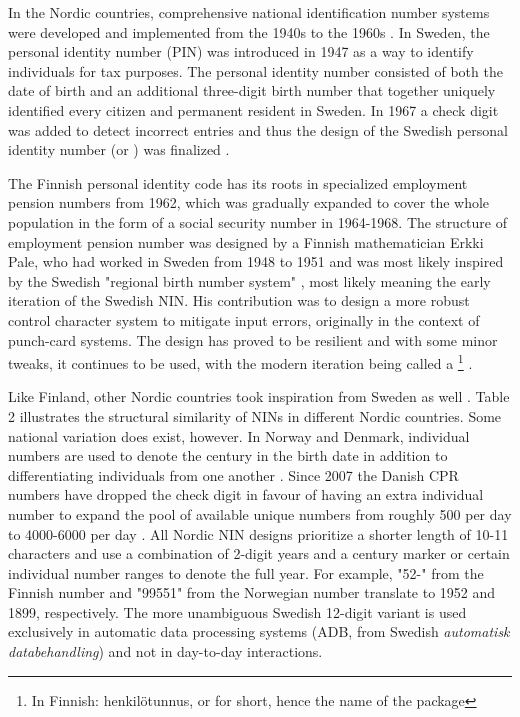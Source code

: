 In the Nordic countries, comprehensive national identification number systems were developed and implemented from the 1940s to the 1960s \citep{watson2010}. In Sweden, the personal identity number (PIN) was introduced in 1947 as a way to identify individuals for tax purposes. The personal identity number consisted of both the date of birth and an additional three-digit birth number that together uniquely identified every citizen and permanent resident in Sweden. In 1967 a check digit was added to detect incorrect entries and thus the design of the Swedish personal identity number (or ) was finalized \citep{johansson2003,scb2016}. 

The Finnish personal identity code has its roots in specialized employment pension numbers from 1962, which was gradually expanded to cover the whole population in the form of a social security number in 1964-1968. The structure of employment pension number was designed by a Finnish mathematician Erkki Pale, who had worked in Sweden from 1948 to 1951 and was most likely inspired by the Swedish "regional birth number system" \citep{alastalo2022}, most likely meaning the early iteration of the Swedish NIN. His contribution was to design a more robust control character system to mitigate input errors, originally in the context of punch-card systems. The design has proved to be resilient and with some minor tweaks, it continues to be used, with the modern iteration being called a \footnote{In Finnish: henkilötunnus, or  for short, hence the name of the package} \citep{salste2021}. 

Like Finland, other Nordic countries took inspiration from Sweden as well \citep{Krogness2011}. Table 2 illustrates the structural similarity of NINs in different Nordic countries. Some national variation does exist, however. In Norway and Denmark, individual numbers are used to denote the century in the birth date in addition to differentiating individuals from one another \citep{furseth2015, cpr2008}. Since 2007 the Danish CPR numbers have dropped the check digit in favour of having an extra individual number to expand the pool of available unique numbers from roughly 500 per day to 4000-6000 per day \citep{cpr2008, jerlach2009}. All Nordic NIN designs prioritize a shorter length of 10-11 characters and use a combination of 2-digit years and a century marker or certain individual number ranges to denote the full year. For example, "52-" from the Finnish number and "99551" from the Norwegian number translate to 1952 and 1899, respectively. The more unambiguous Swedish 12-digit variant is used exclusively in automatic data processing systems (ADB, from Swedish \emph{automatisk databehandling}) and not in day-to-day interactions.


